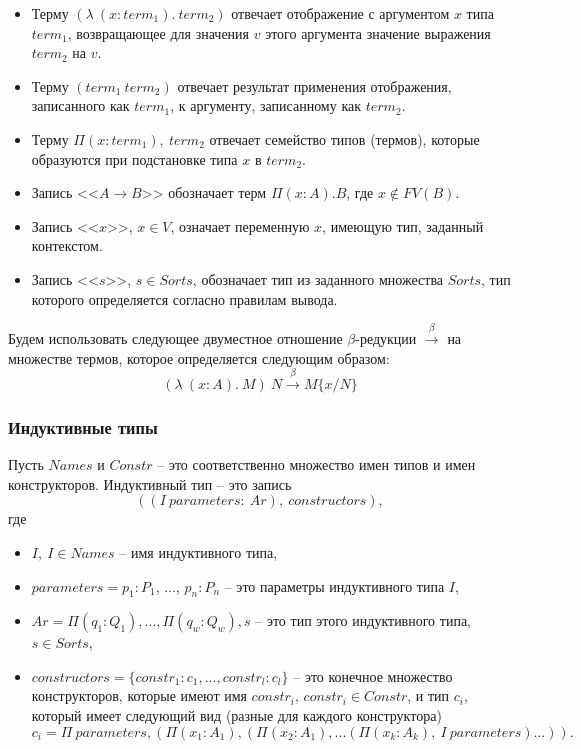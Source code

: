 \documentclass[12pt]{article}
\begin{document}
\begin{itemize}
    \item Терму $(\lambda\ (x: term_1).\ term_2)$
отвечает отображение с аргументом $x$ типа $term_1$, 
возвращающее для значения $v$ этого аргумента 
значение выражения $term_2$ на $v$.

    \item Терму $(term_1\ term_2)$ отвечает результат 
применения отображения, записанного как $term_1$, к аргументу, 
записанному как $term_2$.

    \item Терму $\Pi (x:term_1),\ term_2$
отвечает семейство типов (термов), которые образуются при подстановке типа $x$ в $term_2$.

    \item Запись <<$A \xrightarrow{} B$>> обозначает терм $\Pi (x:A). B$, где $x \notin FV(B)$.
    
    \item Запись <<$x$>>, $x \in V$, означает переменную $x$, имеющую тип, заданный контекстом.
    
    \item Запись <<$s$>>, $s \in Sorts$, обозначает тип из заданного множества $Sorts$, тип которого определяется согласно правилам вывода.
    
    
\end{itemize}

Будем использовать следующее двуместное отношение $\beta$-редукции $\xrightarrow{\beta}$ на множестве термов, которое определяется следующим образом: 
$$(\lambda\ (x: A).\ M)\ N \xrightarrow{\beta} M\{x/N\}$$

\subsubsection{Индуктивные типы}
Пусть $Names$ и $Constr$ -- это соответственно множество имен типов и имен конструкторов.
Индуктивный тип -- это запись $$((I\ parameters:\ Ar),\ constructors),$$ где

\begin{itemize}
    \item $I,\ I \in Names$ -- имя индуктивного типа,
    \item $parameters = p_1:P_1$, ..., $p_n:P_n$ -- это параметры индуктивного типа $I$,
    \item $Ar=\Pi(q_1:Q_1),...,\Pi(q_w:Q_w), s$ -- это тип этого индуктивного типа, $s \in Sorts$,
    \item $constructors = \{constr_1: c_1,...,constr_l: c_l \}$ -- это конечное множество конструкторов, которые имеют имя $constr_i$, $constr_i \in Constr$, и тип $c_i$, который имеет следующий вид (разные для каждого конструктора) $$c_i=\Pi\ parameters,(\Pi(x_{1} : A_{1}),(\Pi(x_{2}: A_{1}),...(\Pi(x_{k} : A_{k}),\ I\ parameters)...)).$$
\end{itemize}
\end{document}
